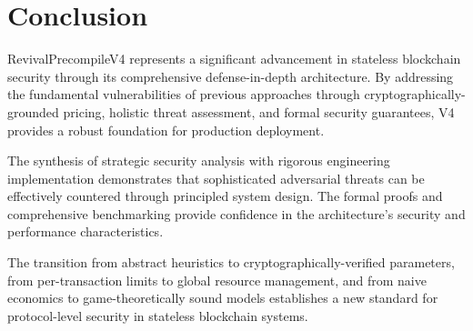\documentclass{article}
\begin{document}
\section{Conclusion}

RevivalPrecompileV4 represents a significant advancement in stateless blockchain security through its comprehensive defense-in-depth architecture. By addressing the fundamental vulnerabilities of previous approaches through cryptographically-grounded pricing, holistic threat assessment, and formal security guarantees, V4 provides a robust foundation for production deployment.

The synthesis of strategic security analysis with rigorous engineering implementation demonstrates that sophisticated adversarial threats can be effectively countered through principled system design. The formal proofs and comprehensive benchmarking provide confidence in the architecture's security and performance characteristics.

The transition from abstract heuristics to cryptographically-verified parameters, from per-transaction limits to global resource management, and from naive economics to game-theoretically sound models establishes a new standard for protocol-level security in stateless blockchain systems.




\end{document}
